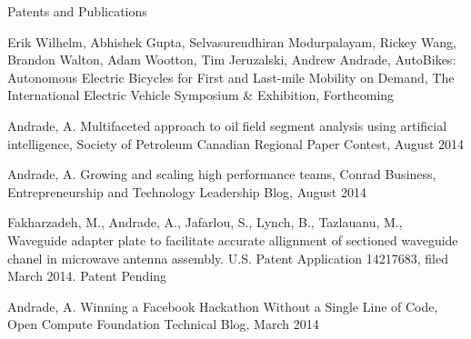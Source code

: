 \documentclass{resume} %
\begin{document}

\begin{rSection}{Patents and Publications}

\item Erik Wilhelm, Abhishek Gupta, Selvasurendhiran Modurpalayam, Rickey Wang, Brandon Walton, Adam Wootton, Tim Jeruzalski, Andrew Andrade, AutoBikes: Autonomous Electric Bicycles for First and Last-mile Mobility on Demand, The International Electric Vehicle Symposium \& Exhibition, Forthcoming

\item Andrade, A.  Multifaceted approach to oil field segment analysis using artificial intelligence,  Society of Petroleum Canadian Regional Paper Contest, August 2014

\item Andrade, A.  Growing and scaling high performance teams,  Conrad Business, Entrepreneurship and Technology Leadership Blog, August 2014

\item Fakharzadeh, M., Andrade, A., Jafarlou, S., Lynch, B., Tazlauanu, M., Waveguide adapter plate to facilitate accurate allignment of sectioned waveguide chanel in microwave antenna assembly.  U.S. Patent Application 14217683, filed March 2014. Patent Pending

\item Andrade, A. Winning a Facebook Hackathon Without a Single Line of Code, Open Compute Foundation Technical Blog, March 2014

\end{rSection}

\end{document}
